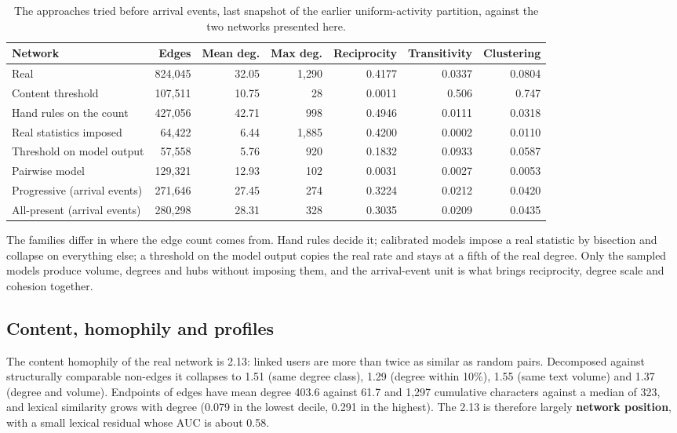 \documentclass[11pt,a4paper]{article}
\begin{document}
\begin{table}[h]
  \centering
  \small
  \caption{The approaches tried before arrival events, last snapshot of the earlier uniform-activity
  partition, against the two networks presented here.}
  \begin{tabular}{@{}lrrrrrr@{}}
    \toprule
    Network & Edges & Mean deg. & Max deg. & Reciprocity & Transitivity & Clustering \\
    \midrule
    Real                                & 824,045 & 32.05 & 1,290 & 0.4177 & 0.0337 & 0.0804 \\
    Content threshold                   & 107,511 & 10.75 & 28    & 0.0011 & 0.506  & 0.747 \\
    Hand rules on the count             & 427,056 & 42.71 & 998   & 0.4946 & 0.0111 & 0.0318 \\
    Real statistics imposed             &  64,422 &  6.44 & 1,885 & 0.4200 & 0.0002 & 0.0110 \\
    Threshold on model output           &  57,558 &  5.76 & 920   & 0.1832 & 0.0933 & 0.0587 \\
    Pairwise model                      & 129,321 & 12.93 & 102   & 0.0031 & 0.0027 & 0.0053 \\
    \midrule
    Progressive (arrival events)        & 271,646 & 27.45 & 274   & 0.3224 & 0.0212 & 0.0420 \\
    All-present (arrival events)        & 280,298 & 28.31 & 328   & 0.3035 & 0.0209 & 0.0435 \\
    \bottomrule
  \end{tabular}
\end{table}

The families differ in where the edge count comes from. Hand rules decide it; calibrated models impose a
real statistic by bisection and collapse on everything else; a threshold on the model output copies the real
rate and stays at a fifth of the real degree. Only the sampled models produce volume, degrees and hubs
without imposing them, and the arrival-event unit is what brings reciprocity, degree scale and cohesion
together.

\subsection{Content, homophily and profiles}
\label{sec:content}
The content homophily of the real network is 2.13: linked users are more than twice as similar as random
pairs. Decomposed against structurally comparable non-edges it collapses to 1.51 (same degree class),
1.29 (degree within 10\%), 1.55 (same text volume) and 1.37 (degree and volume). Endpoints of edges have
mean degree 403.6 against 61.7 and 1,297 cumulative characters against a median of 323, and lexical
similarity grows with degree (0.079 in the lowest decile, 0.291 in the highest). The 2.13 is therefore
largely \textbf{network position}, with a small lexical residual whose AUC is about 0.58.
\end{document}
